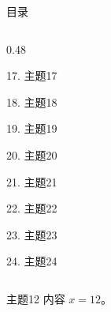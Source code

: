 \documentclass[aspectratio=169,10pt,fontset=fandol]{ctexbeamer}
\begin{document}
\begin{frame}[t,fragile]{目录}
\begin{columns}[T,onlytextwidth]
\begin{column}{0.48\textwidth}
{\color{gray!40}\small 17. 主题17\par}\vspace{0.22em}
{\color{gray!40}\small 18. 主题18\par}\vspace{0.22em}
{\color{gray!40}\small 19. 主题19\par}\vspace{0.22em}
{\color{gray!40}\small 20. 主题20\par}\vspace{0.22em}
{\color{gray!40}\small 21. 主题21\par}\vspace{0.22em}
{\color{gray!40}\small 22. 主题22\par}\vspace{0.22em}
{\color{gray!40}\small 23. 主题23\par}\vspace{0.22em}
{\color{gray!40}\small 24. 主题24\par}\vspace{0.22em}
\end{column}
\end{columns}
\end{frame}
\begin{frame}[t,fragile]{主题12}
\normalsize
{\normalsize
内容 $x=12$。
}
\end{frame}
\end{document}
